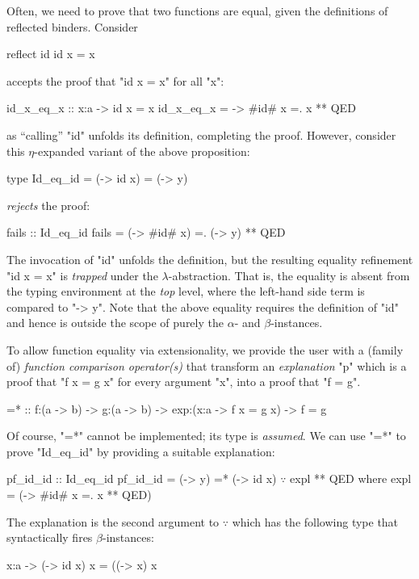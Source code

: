 Often, we need to prove that two
functions are equal, given the
definitions of reflected binders.
%
Consider
%
\begin{code}
    reflect id
    id x = x
\end{code}
%
\toolname accepts the proof that
"id x = x" for all "x":
%
\begin{code}
    id_x_eq_x :: x:a -> {id x = x}
    id_x_eq_x = \x -> #id# x =. x ** QED
\end{code}
%
as ``calling'' "id" unfolds its definition,
completing the proof.
%
However, consider this $\eta$-expanded variant of
the above proposition:
%
\begin{code}
    type Id_eq_id = {(\x -> id x) = (\y -> y)}
\end{code}
%
\toolname \emph{rejects} the proof:
%
\begin{code}
    fails :: Id_eq_id
    fails =  (\x -> #id# x) =. (\y -> y) ** QED
\end{code}
%
The invocation of "id" unfolds the
definition, but the resulting equality
refinement "{id x = x}" is \emph{trapped}
under the $\lambda$-abstraction.
%
That is, the equality is absent from the
typing environment at the \emph{top} level,
where the left-hand side term is compared to "\y -> y".
%
Note that the above equality requires
the definition of "id" and hence is
outside the scope of purely the
$\alpha$- and $\beta$-instances.

%
To allow function equality via
extensionality, we provide the
user with a (family of)
%
\emph{function comparison operator(s)}
that transform an \emph{explanation} "p"
which is a proof that "f x = g x" for every
argument "x", into a proof that "f = g".
%
\begin{mcode}
    =* :: f:(a -> b) -> g:(a -> b) -> exp:(x:a -> {f x = g x}) -> {f = g}
\end{mcode}
%
Of course, "=*" cannot be implemented;
its type is \emph{assumed}. We can use
"=*" to prove "Id_eq_id" by providing
a suitable explanation:
%
\begin{mcode}
    pf_id_id :: Id_eq_id
    pf_id_id = (\y -> y) =* (\x -> id x) $\because$ expl ** QED  where expl = (\x -> #id# x =. x ** QED)
\end{mcode}
%
The explanation is the second argument to $\because$ which has
the following type that syntactically fires $\beta$-instances:
\begin{code}
    x:a -> {(\x -> id x) x = ((\x -> x) x}
\end{code}

